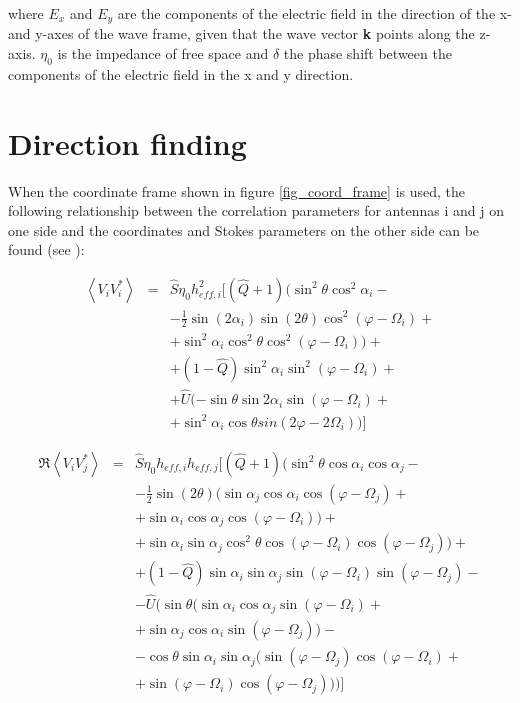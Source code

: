 \documentclass[galley,ras]{agu2001}
\begin{document}
\begin{article}
where $E_{x}$ and $E_{y}$ are the components of the electric field in the direction of the x- and y-axes of the wave frame, given that the wave vector \textbf{k} points along the z-axis. $\eta_0$ is the impedance of free space and $\delta $ the phase shift between the components of the electric field in the x and y direction.\\



\section{Direction finding}\label{sec_DF}
When the coordinate frame shown in figure \ref{fig_coord_frame} is used, the following relationship between the correlation parameters for antennas i and j on one side and the coordinates and Stokes parameters on the other side can be found (see \cite{my_masterthesis}):


\begin{eqnarray}
\left\langle V_i V_i^{*} \right\rangle &=& \hat{S}\eta_0 h_{eff,i}^2[(\hat{Q}+1) (\sin^2 \theta \cos^2 \alpha_i -\nonumber\\
& & -\frac{1}{2} \sin (2\alpha_i) \sin(2\theta) \cos^2(\varphi - \Omega_i) + \nonumber \\
& & + \sin^2\alpha_i \cos^2\theta \cos^2(\varphi - \Omega_i))+ \nonumber \\
& & + (1-\hat{Q}) \sin^2\alpha_i \sin^2 (\varphi - \Omega_i)+ \nonumber \\
& & +  \hat{U}  (-\sin \theta \sin 2\alpha_i \sin(\varphi - \Omega_i) +\nonumber \\
& & + \sin^2\alpha_i \cos \theta sin(2\varphi - 2\Omega_i)) ]
\end{eqnarray}

\begin{eqnarray}
\Re \left\langle V_i V_j^{*}\right\rangle &=& \hat{S}\eta_0 h_{eff,i} h_{eff,j}[(\hat{Q}+1) (\sin^2 \theta \cos \alpha_i \cos \alpha_j - \nonumber\\
& & - \frac{1}{2}  \sin(2\theta) (\sin \alpha_j \cos \alpha_i \cos(\varphi - \Omega_j)+\nonumber \\
& & +\sin \alpha_i \cos \alpha_j \cos(\varphi - \Omega_i) ) + \nonumber \\
& & + \sin \alpha_i \sin \alpha_j \cos^2\theta \cos(\varphi - \Omega_i) \cos(\varphi - \Omega_j))+ \nonumber \\
& & + (1-\hat{Q}) \sin \alpha_i \sin \alpha_j \sin (\varphi - \Omega_i) \sin (\varphi - \Omega_j)-\nonumber \\
& & -\hat{U} (\sin \theta(\sin \alpha_i \cos \alpha_j \sin (\varphi - \Omega_i) +  \nonumber \\
& & + \sin \alpha_j \cos \alpha_i \sin (\varphi - \Omega_j))- \nonumber \\
& & - \cos \theta \sin \alpha_i \sin \alpha_j(\sin (\varphi - \Omega_j) \cos (\varphi - \Omega_i)+ \nonumber \\
& & + \sin (\varphi - \Omega_i) \cos (\varphi - \Omega_j) ) )]
\end{eqnarray}


\end{article}
\end{document}
